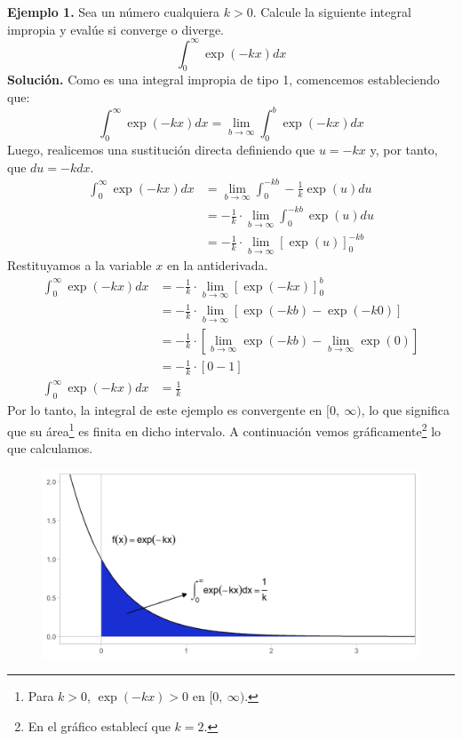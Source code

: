 \documentclass[12pt]{article}
\begin{document}
\textbf{Ejemplo 1.} Sea un número cualquiera $k > 0$. Calcule la siguiente integral impropia y evalúe si converge o diverge.
\[
  \int_{0}^{\infty} \exp(-kx) dx
\]
\textbf{Solución.} Como es una integral impropia de tipo 1, comencemos estableciendo que:
\[
  \int_{0}^{\infty} \exp(-kx) dx = \lim_{b \to \infty} \int_{0}^{b} \exp(-kx) dx
\]
Luego, realicemos una sustitución directa definiendo que $u = -kx$ y, por tanto, que $du = -k dx$.
\begin{align*}
  \int_{0}^{\infty} \exp(-kx) dx &= \lim_{b \to \infty} \int_{0}^{-kb} -\frac{1}{k} \exp(u) du \\
                                 &= -\frac{1}{k} \cdot \lim_{b \to \infty} \int_{0}^{-kb} \exp(u) du \\
                                 &= -\frac{1}{k} \cdot \lim_{b \to \infty} [\exp(u)]_{0}^{-kb}
\end{align*}
Restituyamos a la variable $x$ en la antiderivada.
\begin{align*}
  \int_{0}^{\infty} \exp(-kx) dx &= -\frac{1}{k} \cdot \lim_{b \to \infty} [\exp(-kx)]_{0}^{b} \\
                                 &= -\frac{1}{k} \cdot \lim_{b \to \infty} [\exp(-kb) - \exp(-k0)] \\
                                 &= -\frac{1}{k} \cdot [\lim_{b \to \infty} \exp(-kb) - \lim_{b \to \infty} \exp(0)] \\
                                 &= -\frac{1}{k} \cdot [0 - 1] \\
  \int_{0}^{\infty} \exp(-kx) dx &= \frac{1}{k}
\end{align*}
Por lo tanto, la integral de este ejemplo es convergente en $[0, \ \infty)$, lo que significa que su área\footnote{Para $k > 0$, $\exp(-kx) > 0$ en $[0, \ \infty)$.} es finita en dicho intervalo. A continuación vemos gráficamente\footnote{En el gráfico establecí que $k = 2$.} lo que calculamos.

\begin{figure}[hbt!]
\centering
\includegraphics[scale=0.7]{example-01.jpg}
\end{figure}
\end{document}
